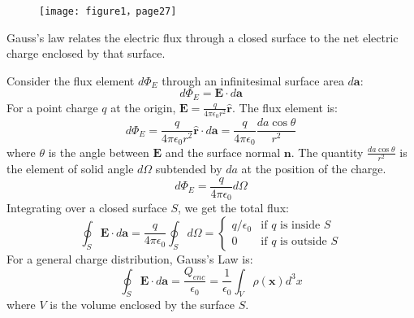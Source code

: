 \documentclass[12pt, a4paper]{article}
\begin{document}
    \begin{figure}[h]
    	\centering
    	\texttt{[image: figure1，page27]}
    	\caption{}
    	\label{fig:figure1page27}
    \end{figure}
	
	Gauss's law relates the electric flux through a closed surface to the net electric charge enclosed by that surface.

	Consider the flux element $d\Phi_E$ through an infinitesimal surface area $d\bm{a}$:
	\begin{equation}
		d\Phi_E = \bm{E} \cdot d\bm{a}
	\end{equation}
	For a point charge $q$ at the origin, $\bm{E} = \frac{q}{4\pi\epsilon_0 r^2}\hat{\bm{r}}$. The flux element is:
	\begin{equation}
		d\Phi_E = \frac{q}{4\pi\epsilon_0 r^2} \hat{\bm{r}} \cdot d\bm{a} = \frac{q}{4\pi\epsilon_0} \frac{da \cos\theta}{r^2}
	\end{equation}
	where $\theta$ is the angle between $\bm{E}$ and the surface normal $\bm{n}$. The quantity $\frac{da \cos\theta}{r^2}$ is the element of solid angle $d\Omega$ subtended by $da$ at the position of the charge.
	\begin{equation}
		d\Phi_E = \frac{q}{4\pi\epsilon_0} d\Omega
	\end{equation}
	Integrating over a closed surface $S$, we get the total flux:
	\begin{equation}
		\oint_S \bm{E} \cdot d\bm{a} = \frac{q}{4\pi\epsilon_0} \oint_S d\Omega =
		\begin{cases}
			q/\epsilon_0 & \text{if } q \text{ is inside } S \\
			0 & \text{if } q \text{ is outside } S
		\end{cases}
	\end{equation}
	For a general charge distribution, Gauss's Law is:
	\begin{equation}
		\oint_S \bm{E} \cdot d\bm{a} = \frac{Q_{enc}}{\epsilon_0} = \frac{1}{\epsilon_0} \int_V \rho(\bm{x}) d^3x
	\end{equation}
	where $V$ is the volume enclosed by the surface $S$.
	
\end{document}
